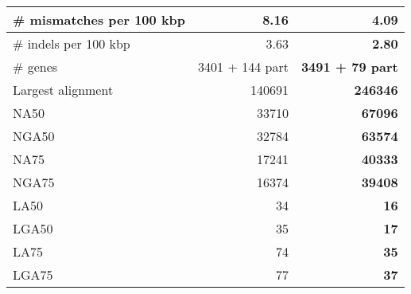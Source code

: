 \documentclass[12pt,a4paper]{article}
\begin{document}
\begin{table}[ht]
\begin{center}
\begin{tabular}{|l*{2}{|r}|}
\# mismatches per 100 kbp & 8.16 & {\bf 4.09} \\ \hline
\# indels per 100 kbp & 3.63 & {\bf 2.80} \\ \hline
\# genes & 3401 + 144 part & {\bf 3491 + 79 part} \\ \hline
Largest alignment & 140691 & {\bf 246346} \\ \hline
NA50 & 33710 & {\bf 67096} \\ \hline
NGA50 & 32784 & {\bf 63574} \\ \hline
NA75 & 17241 & {\bf 40333} \\ \hline
NGA75 & 16374 & {\bf 39408} \\ \hline
LA50 & 34 & {\bf 16} \\ \hline
LGA50 & 35 & {\bf 17} \\ \hline
LA75 & 74 & {\bf 35} \\ \hline
LGA75 & 77 & {\bf 37} \\ \hline
\end{tabular}
\end{center}
\end{table}
\end{document}
